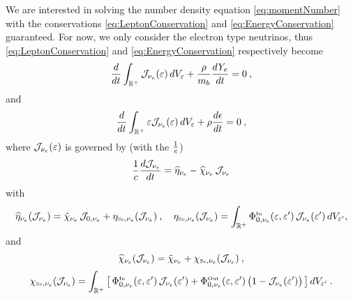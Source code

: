 \documentclass[12pt]{article}
\newcommand{\IN}{\mbox{\tiny In}}
\newcommand{\SC}{\mbox{\tiny Sc}}      %
\begin{document}
We are interested in solving the number density equation \eqref{eq:momentNumber} with the conservations \eqref{eq:LeptonConservation} and \eqref{eq:EnergyConservation} guaranteed.
For now, we only consider the electron type neutrinos, thus \eqref{eq:LeptonConservation} and \eqref{eq:EnergyConservation} respectively become
\begin{equation}\label{eq:LeptonConservationNue}
  \frac{d }{d t}\int_{\mathbb{R}^{+}}\mathcal{J}_{\nu_{e}}(\varepsilon)\,dV_{\varepsilon}+\frac{\rho}{m_{b}}\frac{d Y_{e}}{d t} = 0\:,
\end{equation}
and 
\begin{equation}\label{eq:EnergyConservationNue}
  \frac{d }{d t}\int_{\mathbb{R}^{+}}\varepsilon\mathcal{J}_{\nu_{e}}(\varepsilon)\,dV_{\varepsilon}+\rho\frac{d \epsilon}{d t} = 0\:,
\end{equation}
where $\mathcal{J}_{\nu_{e}}(\varepsilon)$ is governed by (with the $\frac{1}{c}$)
\begin{equation}\label{eq:momentNumberNue}
\frac{1}{c}  \frac{d \mathcal{J}_{\nu_{e}}}{d t}
  =\widehat{\eta}_{\nu_{e}} - \widehat{\chi}_{\nu_{e}}\,\mathcal{J}_{\nu_{e}}
\end{equation}
with
\begin{equation}
  \widehat{\eta}_{\nu_{e}}(\cJ_{\nu_{e}})
  =\tilde{\chi}_{\nu_{e}}\,\cJ_{0,\nu_{e}} + \eta_{\SC,\nu_{e}}(\cJ_{\nu_{e}})\:,\quad
  \eta_{\SC,\nu_{e}}(\cJ_{\nu_{e}})
  =\int_{\bbR^{+}}\Phi_{0,\nu_{e}}^{\IN}(\varepsilon,\varepsilon')\,\cJ_{\nu_{e}}(\varepsilon')\,dV_{\varepsilon'},
\end{equation}
and 
\begin{equation}
  \widehat{\chi}_{\nu_{e}}(\cJ_{\nu_{e}})
  =\tilde{\chi}_{\nu_{e}} + \chi_{\SC,\nu_{e}}(\cJ_{\nu_{e}})\:,
\end{equation}
\begin{equation}
  \chi_{\SC,\nu_{e}}(\cJ_{\nu_{e}})
  =\int_{\bbR^{+}}\big[\,\Phi_{0,\nu_{e}}^{\IN}(\varepsilon,\varepsilon')\,\cJ_{\nu_{e}}(\varepsilon')+\Phi_{0,\nu_{e}}^{\Out}(\varepsilon,\varepsilon')\,\big(1-\cJ_{\nu_{e}}(\varepsilon')\big)\,\big]\,dV_{\varepsilon'}\:.
\end{equation}
\end{document}
